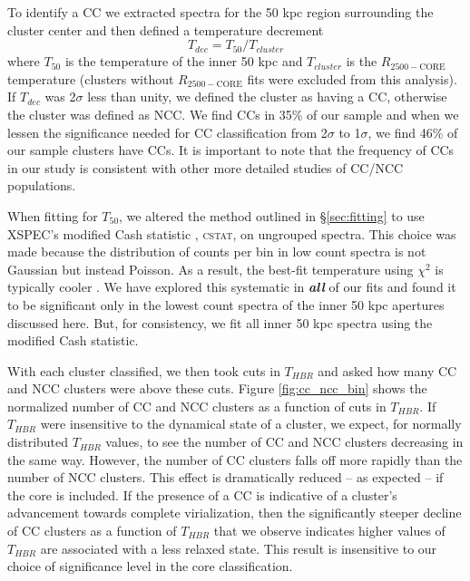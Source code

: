\documentclass[12pt,preprint]{aastex}
\begin{document}
To identify a CC we extracted spectra for the 50 kpc region
surrounding the cluster center and then defined a temperature
decrement 
\begin{equation}
T_{dec} = T_{50}/T_{cluster}
\label{eqn:tdec}
\end{equation}
where $T_{50}$ is the temperature of the inner 50 kpc and
$T_{cluster}$ is the $R_{2500-\mathrm{CORE}}$ temperature (clusters
without $R_{2500-\mathrm{CORE}}$ fits were excluded from this
analysis). If $T_{dec}$ was 2$\sigma$ less than unity, we defined the
cluster as having a CC, otherwise the cluster was defined as NCC. We
find CCs in 35\% of our sample and when we lessen the significance
needed for CC classification from 2$\sigma$ to 1$\sigma$, we find 46\%
of our sample clusters have CCs. It is important to note that the
frequency of CCs in our study is consistent with other more detailed
studies of CC/NCC populations.

When fitting for $T_{50}$, we altered the method outlined in
\S\ref{sec:fitting} to use {\textsc{XSPEC}}'s modified Cash statistic
\citep{1979ApJ...228..939C}, {\textsc{cstat}}, on ungrouped
spectra. This choice was made because the distribution of counts per
bin in low count spectra is not Gaussian but instead Poisson. As a
result, the best-fit temperature using $\chi^2$ is typically cooler
\citep{1989ApJ...342.1207N, 2007A&A...462..429B}. We have explored
this systematic in {\bfseries\em{all}} of our fits and found it to be
significant only in the lowest count spectra of the inner 50 kpc
apertures discussed here. But, for consistency, we fit all inner 50
kpc spectra using the modified Cash statistic.

With each cluster classified, we then took cuts in $T_{HBR}$ and asked
how many CC and NCC clusters were above these cuts.  Figure
\ref{fig:cc_ncc_bin} shows the normalized number of CC and NCC
clusters as a function of cuts in $T_{HBR}$. If $T_{HBR}$ were
insensitive to the dynamical state of a cluster, we expect, for
normally distributed $T_{HBR}$ values, to see the number of CC and NCC
clusters decreasing in the same way. However, the number of CC
clusters falls off more rapidly than the number of NCC clusters. This
effect is dramatically reduced -- as expected -- if the core is
included.  If the presence of a CC is indicative of a cluster's
advancement towards complete virialization, then the significantly
steeper decline of CC clusters as a function of $T_{HBR}$ that we
observe indicates higher values of $T_{HBR}$ are associated with a
less relaxed state. This result is insensitive to our choice of
significance level in the core classification.
\end{document}
